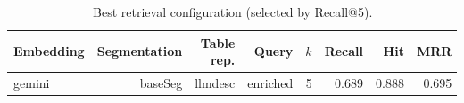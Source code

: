 \begin{table}[htbp]
  \centering
  \caption{Best retrieval configuration (selected by Recall@5).}
  \label{tab:retrieval-winner}
  \begin{tabular}{lrrrrrrr}
    \toprule
    Embedding & Segmentation & Table rep. & Query & $k$ & Recall & Hit & MRR \\
    \midrule
    gemini & baseSeg & llmdesc & enriched & 5 & 0.689 & 0.888 & 0.695 \\
    \bottomrule
  \end{tabular}
\end{table}
